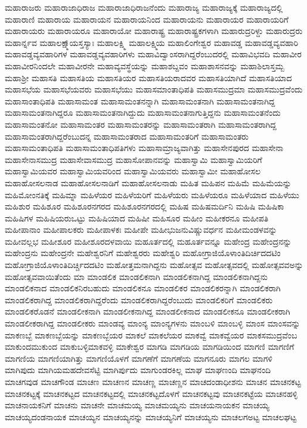 {ಮಹಾರಾಜರು
ಮಹಾರಾಜಾಧಿರಾಜ
ಮಹಾರಾಜಾಧಿರಾಜನೆಂದು
ಮಹಾರಾಜ್ಯ
ಮಹಾರಾಜ್ಯಕ್ಕೆ
ಮಹಾರಾಜ್ಯದಲ್ಲಿ
ಮಹಾರಾಣಿ
ಮಹಾರಾಯ
ಮಹಾರಾಯನ
ಮಹಾರಾಯನಿಂದ
ಮಹಾರಾಯನು
ಮಹಾರಾಯರ
ಮಹಾರಾಯರಿಗೆ
ಮಹಾರಾಯರು
ಮಹಾರಾಯರೂ
ಮಹಾರಾಯೋ
ಮಹಾರಾಷ್ಟ್ರ
ಮಹಾರಾಷ್ಟ್ರಕಗಳಾಗಿ
ಮಹಾರುದ್ರರಿಳ್ದು
ಮಹಾರುದ್ರರು
ಮಹಾರ್ನ್ನವ
ಮಹಾಲಕ್ಷ್ಮಾ್ಯಸ್ತಸ್ಯಾಃ
ಮಹಾಲಕ್ಷ್ಮಿ
ಮಹಾಲಕ್ಷ್ಮಿಯ
ಮಹಾಲಿಂಗೇಶ್ವರ
ಮಹಾವಡ್ಡ
ಮಹಾವಡ್ಡವ್ಯವಹಾರಿ
ಮಹಾವಡ್ಡವ್ಯವಹಾರಿಗಳ
ಮಹಾವಡ್ಡವ್ಯವಹಾರಿಗಳು
ಮಹಾವಿದ್ವಾಂಸರಾಗಿದ್ದರೆಂಬುದರಲ್ಲಿ
ಮಹಾವಿಭವದಿ
ಮಹಾವೀರ
ಮಹಾವೀರನಿಂದಲೇ
ಮಹಾವೀರನೇ
ಮಹಾವ್ಯವಸ್ಥೆಯನ್ನು
ಮಹಾಶಬ್ದವಂ
ಮಹಾಶಾಸನವನ್ನು
ಮಹಾಶಿಲಾಸ್ತಮ್ಬ
ಮಹಾಶ್ರೀ
ಮಹಾಸತಿ
ಮಹಾಸತಿಯ
ಮಹಾಸತಿಯರ
ಮಹಾಸತಿಯರಾದವರ
ಮಹಾಸತಿಯಾಗಿದೆ
ಮಹಾಸತಿಯಾದ
ಮಹಾಸಭೆಯ
ಮಹಾಸಭೆಯವರು
ಮಹಾಸಭೆಯು
ಮಹಾಸಮಾಂತಾಧಿಪತಿ
ಮಹಾಸಮುದ್ರಮಾ
ಮಹಾಸಮುದ್ರವೆಂದು
ಮಹಾಸಾಂತಾಧಿಪತಿ
ಮಹಾಸಾಮಂತ
ಮಹಾಸಾಮಂತನನ್ನಾಗಿ
ಮಹಾಸಾಮಂತನಾಗಿ
ಮಹಾಸಾಮಂತನಾಗಿದ್ದ
ಮಹಾಸಾಮಂತನಾಗಿದ್ದರೂ
ಮಹಾಸಾಮಂತನಾಗಿದ್ದುದು
ಮಹಾಸಾಮಂತನಾಗುತ್ತಿದ್ದನು
ಮಹಾಸಾಮಂತನೆಂದು
ಮಹಾಸಾಮಂತನೋ
ಮಹಾಸಾಮಂತರ
ಮಹಾಸಾಮಂತರನ್ನು
ಮಹಾಸಾಮಂತರಾಗಿ
ಮಹಾಸಾಮಂತರಾಗಿದ್ದ
ಮಹಾಸಾಮಂತರಾಗಿದ್ದರೆಂಬುದನ್ನ
ಮಹಾಸಾಮಂತರಾದ
ಮಹಾಸಾಮಂತರಿಗೆ
ಮಹಾಸಾಮಂತರು
ಮಹಾಸಾಮಂತಾಧಿಪತಿ
ಮಹಾಸಾಮಂತಾಧಿಪತಿಗಳು
ಮಹಾಸಾಮ್ರಾಜ್ಯವಾಗಿತ್ತು
ಮಹಾಸೇನಪುರದ
ಮಹಾಸೇನಾ
ಮಹಾಸೇನಾಸಮುದ್ರ
ಮಹಾಸೇವಾಸಮುದ್ರ
ಮಹಾಸೋಪಾನವನ್ನು
ಮಹಾಸ್ವಾಮಿ
ಮಹಾಸ್ವಾಮಿಯರಿಗೆ
ಮಹಾಸ್ವಾಮಿಯವರ
ಮಹಾಸ್ವಾಮಿಯವರಿಂದ
ಮಹಾಸ್ವಾಮಿಯವರು
ಮಹಾಸ್ವಾಮೀ
ಮಹಾಹೋಸಲ
ಮಹಾಹೋಸಲನಾಡ
ಮಹಾಹೋಸಲನಾಡಿಗೆ
ಮಹಾಹೋಸಲನಾಡು
ಮಹಿತ
ಮಹಿಪನ
ಮಹಿಮೆ
ಮಹಿಮೆಯನ್ನು
ಮಹಿಮೋಂನತಿಕ್ಕೆ
ಮಹಿಮ್ನಾ
ಮಹಿಳೆಯರ
ಮಹಿಳೆಯರಿಗೆ
ಮಹಿಳೆಯರು
ಮಹಿಳೆಯರೂ
ಮಹಿಳೆಯಾದ
ಮಹಿಳೆಯು
ಮಹಿಶುರ
ಮಹಿಶೂರ
ಮಹಿಶೂರನಗರದ
ಮಹಿಶೂರನಗರದಲ್ಲಿ
ಮಹಿಷ
ಮಹಿಷಮರ್ದಿನಿ
ಮಹಿಷಿ
ಮಹಿಷಿಕಾ
ಮಹಿಷಿಗಳ
ಮಹಿಷಿಯರುಒಟ್ಟು
ಮಹಿಷಿಯಾದ
ಮಹಿಷೀ
ಮಹಿಸೂರ
ಮಹೀಂ
ಮಹೀಕರನೂ
ಮಹೀಪತಿ
ಮಹೀಪಾನಾಂ
ಮಹೀಪಾಲಕರು
ಮಹೀಪಾಳಕಃ
ಮಹೀಪೇ
ಮಹೀಭುಜನುವಿಷ್ಣುವರ್ಧನ
ಮಹೀಮಂಡಳವನ್ನು
ಮಹೀವಲ್ಲಭ
ಮಹೀಶೂರ
ಮಹೀಶೂರದಳವಾಯಿ
ಮಹೂರ್ತದಲ್ಲಿ
ಮಹೂರ್ತವನ್ನೂ
ಮಹೇಂದ್ರ
ಮಹೇಂದ್ರನನ್ನು
ಮಹೇಂದ್ರನು
ಮಹೇಂದ್ರನೇ
ಮಹೇಶ್ವರನಿಗೆ
ಮಹೇಶ್ವರರು
ಮಹೇಶ್ವರಿ
ಮಹೋಗ್ರಾಜಿಯೊಳಾಂತಿದಿರ್ಚಿದದಟಿಂ
ಮಹೋಗ್ರಾಜಿಯೊಳಾಂತಿದಿರ್ಚ್ಚಿದದಟಿಂ
ಮಹೋತ್ತಮನಾಗಿದ್ದನು
ಮಹೋತ್ಸವ
ಮಹೋತ್ಸವದಲ್ಲಿ
ಮಹೋತ್ಸವವಅನ್ನು
ಮಹೋತ್ಸವವಾಯಿತೆಂದು
ಮಾ
ಮಾಂಡಲಿಕ
ಮಾಂಡಲಿಕನಾಗಿ
ಮಾಂಡಲಿಕನಾಗಿದ್ದ
ಮಾಂಡಲಿಕನಾಗಿದ್ದನು
ಮಾಂಡಲಿಕನಾದ
ಮಾಂಡಲಿಕನಿರಬಹುದು
ಮಾಂಡಲಿಕನೂ
ಮಾಂಡಲಿಕರ
ಮಾಂಡಲಿಕರನ್ನಾಗಿ
ಮಾಂಡಲಿಕರಾಗಿ
ಮಾಂಡಲಿಕರಾಗಿದ್ದ
ಮಾಂಡಲಿಕರಾಗಿದ್ದರೆಂದು
ಮಾಂಡಲಿಕರಾಗಿದ್ದರೆಂಬುದು
ಮಾಂಡಲಿಕರಿಗೆ
ಮಾಂಡಲಿಕರು
ಮಾಂಡಲಿಕರೊಡನೆ
ಮಾಂಡಲೀಕನಾಗಿ
ಮಾಂಡಲೀಕನಾಗಿದ್ದ
ಮಾಂಡಲೀಕನಾದ
ಮಾಂಡಲೀಕನೂ
ಮಾಂಡಲೀಕರಾಗಿ
ಮಾಂಡಲೀಕರಾಗಿದ್ದ
ಮಾಂಡಲೀಕರು
ಮಾಂಡವ್ಯ
ಮಾಂನ್ಯ
ಮಾಂನ್ಯಗಳನು
ಮಾಂಬಳಿ
ಮಾಂಬಳ್ಳಿ
ಮಾಂಸ
ಮಾಂಸವನ್ನು
ಮಾಕಣಬ್ಬೆ
ಮಾಕಣಬ್ಬೆಯನ್ನು
ಮಾಕಣಬ್ಬೆಯರ
ಮಾಕಲೆ
ಮಾಕಲೆಯರ
ಮಾಕವ್ವೆ
ಮಾಕವ್ವೆಯರ
ಮಾಕಸಮುದ್ರವೆಂಬ
ಮಾಕುಂದಮುಕುಂದ
ಮಾಕುಬಳ್ಳಿಮಾಕವಳ್ಳಿ
ಮಾಕೇಶ್ವರ
ಮಾಗಡಿ
ಮಾಗಡಿಯ
ಮಾಗಡಿಯಿಂದ
ಮಾಗಣಿ
ಮಾಗಣಿಗೆ
ಮಾಗಣಿಯ
ಮಾಗಣಿಯಾಗಿತ್ತು
ಮಾಗಣಿಯೊಳಗೆ
ಮಾಗಣೆಗೆ
ಮಾಗಣೆಯ
ಮಾಗನೂರು
ಮಾಗಲ
ಮಾಗಳಿ
ಮಾಗಿಪುದು
ಮಾಗಿಯಮಹದೇವಸೆಟ್ಟಿ
ಮಾಗಿರ್ಪುದು
ಮಾಗುಂಡರಕಿಲ್ಲ
ಮಾಘ
ಮಾಘಣಂದಿ
ಮಾಘನಂದಿ
ಮಾಚಗವುಡ
ಮಾಚಗೌಂಡ
ಮಾಚಣ
ಮಾಚಣನ
ಮಾಚಣ್ಣ
ಮಾಚಣ್ಣನ
ಮಾಚದಂಡಾಧೀಶನು
ಮಾಚನ
ಮಾಚನಕಟ್ಟ
ಮಾಚನಕಟ್ಟಕ್ಕೆ
ಮಾಚನಕಟ್ಟದ
ಮಾಚನಕಟ್ಟದಲ್ಲಿ
ಮಾಚನಕಟ್ಟದೊಳಗೆ
ಮಾಚನಕಟ್ಟವು
ಮಾಚನಕಟ್ಟೆಯ
ಮಾಚನಹಳ್ಳಿ
ಮಾಚನಾಯಕನಿಗೆ
ಮಾಚನು
ಮಾಚನೇ
ಮಾಚಮಯ್ಯ
ಮಾಚಮಯ್ಯನು
ಮಾಚಯನಾಯಕನ
ಮಾಚಯ್ಯ
ಮಾಚಯ್ಯದಂಡನಾಯಕ
ಮಾಚಯ್ಯನ
ಮಾಚಯ್ಯನನ್ನು
ಮಾಚಯ್ಯನಿಗೆ
ಮಾಚಯ್ಯನು
ಮಾಚಲಗಅಟ್ಟ
ಮಾಚಲಘಟ್ಟ
}
